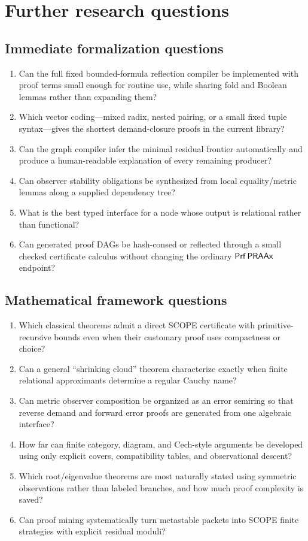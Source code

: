 \section{Further research questions}

\subsection{Immediate formalization questions}

\begin{enumerate}
\item Can the full fixed bounded-formula reflection compiler be implemented with proof terms small enough for routine use, while sharing fold and Boolean lemmas rather than expanding them?
\item Which vector coding---mixed radix, nested pairing, or a small fixed tuple syntax---gives the shortest demand-closure proofs in the current library?
\item Can the graph compiler infer the minimal residual frontier automatically and produce a human-readable explanation of every remaining producer?
\item Can observer stability obligations be synthesized from local equality/metric lemmas along a supplied dependency tree?
\item What is the best typed interface for a node whose output is relational rather than functional?
\item Can generated proof DAGs be hash-consed or reflected through a small checked certificate calculus without changing the ordinary \(\mathsf{Prf}\,\mathsf{PRAAx}\) endpoint?
\end{enumerate}

\subsection{Mathematical framework questions}

\begin{enumerate}
\item Which classical theorems admit a direct SCOPE certificate with primitive-recursive bounds even when their customary proof uses compactness or choice?
\item Can a general ``shrinking cloud'' theorem characterize exactly when finite relational approximants determine a regular Cauchy name?
\item Can metric observer composition be organized as an error semiring so that reverse demand and forward error proofs are generated from one algebraic interface?
\item How far can finite category, diagram, and Cech-style arguments be developed using only explicit covers, compatibility tables, and observational descent?
\item Which root/eigenvalue theorems are most naturally stated using symmetric observations rather than labeled branches, and how much proof complexity is saved?
\item Can proof mining systematically turn metastable packets into SCOPE finite strategies with explicit residual moduli?
\end{enumerate}


